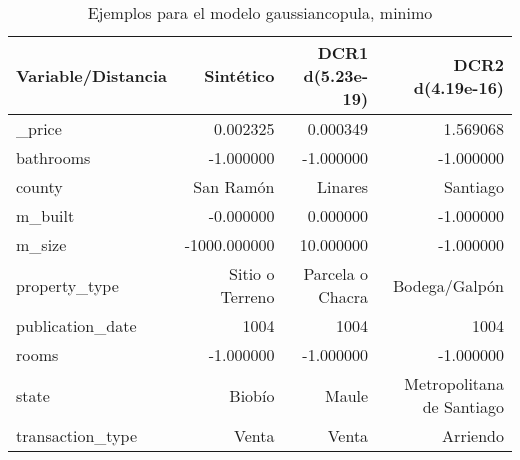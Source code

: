 \begin{table}[H]
\centering
\fontsize{10}{14}\selectfont
\caption{Ejemplos para el modelo gaussiancopula, minimo}
\label{table-example-economicos-b-2-gaussiancopula-min}
\begin{tabular}{|l|r|r|r|}
\hline
\rowcolor[gray]{0.8}
Variable/Distancia & Sintético & DCR1 d(5.23e-19) & DCR2 d(4.19e-16) \\
\hline \_price & \cellcolor[rgb]{0.9, 0.54, 0.52} 0.002325 & \cellcolor[rgb]{0.9, 0.54, 0.52} 0.000349 & 1.569068 \\
\hline bathrooms & \cellcolor[rgb]{0.9, 0.54, 0.52} -1.000000 & \cellcolor[rgb]{0.9, 0.54, 0.52} -1.000000 & \cellcolor[rgb]{0.9, 0.54, 0.52} -1.000000 \\
\hline county & \cellcolor[rgb]{0.9, 0.54, 0.52} San Ramón & Linares & Santiago \\
\hline m\_built & \cellcolor[rgb]{0.9, 0.54, 0.52} -0.000000 & \cellcolor[rgb]{0.9, 0.54, 0.52} 0.000000 & \cellcolor[rgb]{0.9, 0.54, 0.52} -1.000000 \\
\hline m\_size & \cellcolor[rgb]{0.9, 0.54, 0.52} -1000.000000 & 10.000000 & \cellcolor[rgb]{0.9, 0.54, 0.52} -1.000000 \\
\hline property\_type & \cellcolor[rgb]{0.9, 0.54, 0.52} Sitio o Terreno & Parcela o Chacra & Bodega/Galpón \\
\hline publication\_date & \cellcolor[rgb]{0.9, 0.54, 0.52} 1004 & \cellcolor[rgb]{0.9, 0.54, 0.52} 1004 & \cellcolor[rgb]{0.9, 0.54, 0.52} 1004 \\
\hline rooms & \cellcolor[rgb]{0.9, 0.54, 0.52} -1.000000 & \cellcolor[rgb]{0.9, 0.54, 0.52} -1.000000 & \cellcolor[rgb]{0.9, 0.54, 0.52} -1.000000 \\
\hline state & \cellcolor[rgb]{0.9, 0.54, 0.52} Biobío & Maule & Metropolitana de Santiago \\
\hline transaction\_type & \cellcolor[rgb]{0.9, 0.54, 0.52} Venta & \cellcolor[rgb]{0.9, 0.54, 0.52} Venta & Arriendo \\
\hline
\end{tabular}
\end{table}
